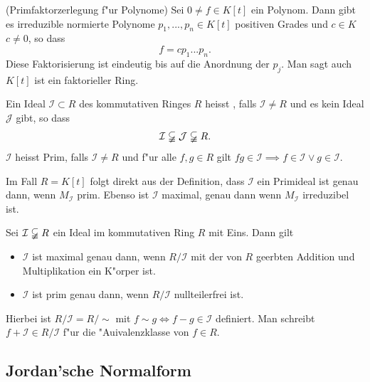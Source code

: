 \documentclass[11pt, a4paper]{article}
\begin{document}
 
 
 \begin{theorem} (Primfaktorzerlegung f"ur Polynome)
 Sei $0 \neq f \in K[t]$ ein Polynom. Dann gibt es irreduzible normierte Polynome $p_1, ..., p_n \in K[t]$ positiven Grades und $c \in K$ $c\neq 0$, so dass
 $$
 f = cp_1 ... p_n.
 $$
 Diese Faktorisierung ist eindeutig bis auf die Anordnung der $p_j$.
 Man sagt auch $K[t]$ ist ein faktorieller Ring.
 \end{theorem}
 
 
 
 \begin{definition}
 Ein Ideal $\mathcal{I} \subset R$ des kommutativen Ringes $R$ heisst , falls $\mathcal{I} \neq R$ und es kein Ideal $\mathcal{J}$ gibt, so dass 
 $$
\mathcal{I} \varsubsetneqq \mathcal{J} \varsubsetneqq R.
 $$
 $\mathcal{I}$ heisst Prim, falls $\mathcal{I} \neq R$ und f"ur alle $f, g \in R$ gilt $fg \in \mathcal{I} \implies
  f \in \mathcal{I} \vee g \in \mathcal{I}$.
 \end{definition}
 
 \begin{remark}
 Im Fall $R = K[t]$ folgt direkt aus der Definition, dass $\mathcal{I}$ ein Primideal ist genau dann, wenn $M_\mathcal{I}$ prim. Ebenso ist $\mathcal{I}$ maximal, genau dann wenn $M_\mathcal{I}$ irreduzibel ist.
 \end{remark}
 
 \begin{lemma}
 Sei $\mathcal{I} \varsubsetneqq R$ ein Ideal im kommutativen Ring $R$ mit Eins. Dann gilt \begin{itemize}
 \item $\mathcal{I}$ ist maximal genau dann, wenn $R / \mathcal{I}$ mit der von $R$ geerbten Addition und Multiplikation ein K"orper ist.
 \item $\mathcal{I}$ ist prim genau dann, wenn $R/ \mathcal{I}$ nullteilerfrei ist.
 \end{itemize}
 Hierbei ist $R / \mathcal{I} = R / \sim$ mit $f \sim g \Leftrightarrow f - g \in \mathcal{I}$ definiert. Man schreibt $f + \mathcal{I} \in R / \mathcal{I}$ f"ur die "Auivalenzklasse von $f \in R$. 
 \end{lemma}
 
 
 \subsection{Jordan'sche Normalform}
 
\end{document}
